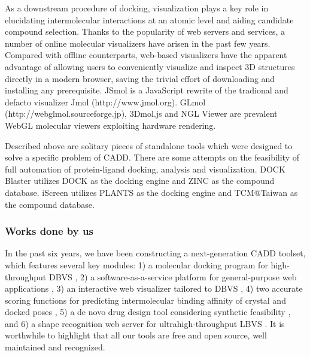 \documentclass[a4paper,12pt]{article}
\begin{document}
As a downstream procedure of docking, visualization plays a key role in elucidating intermolecular interactions at an atomic level and aiding candidate compound selection. Thanks to the popularity of web servers and services, a number of online molecular visualizers have arisen in the past few years. Compared with offline counterparts, web-based visualizers have the apparent advantage of allowing users to conveniently visualize and inspect 3D structures directly in a modern browser, saving the trivial effort of downloading and installing any prerequisite. JSmol \citep{1314} is a JavaScript rewrite of the tradional and defacto visualizer Jmol (http://www.jmol.org). GLmol (http://webglmol.sourceforge.jp), 3Dmol.js \citep{1652} and NGL Viewer \citep{1666} are prevalent WebGL molecular viewers exploiting hardware rendering.

Described above are solitary pieces of standalone tools which were designed to solve a specific problem of CADD. There are some attempts on the feasibility of full automation of protein-ligand docking, analysis and visualization. DOCK Blaster \citep{557} utilizes DOCK \citep{1222} as the docking engine and ZINC \citep{1178} as the compound database. iScreen \citep{899} utilizes PLANTS \citep{607,779} as the docking engine and TCM@Taiwan \citep{528} as the compound database.

\subsubsection*{Works done by us}

In the past six years, we have been constructing a next-generation CADD toolset, which features several key modules: 1) a molecular docking program for high-throughput DBVS \citep{1153}, 2) a software-as-a-service platform for general-purpose web applications \citep{1362}, 3) an interactive web visualizer tailored to DBVS \citep{1366,1265}, 4) two accurate scoring functions for predicting intermolecular binding affinity of crystal and docked poses \citep{1647,1796,1433,1795,1797,1434}, 5) a de novo drug design tool considering synthetic feasibility \citep{1409,1387}, and 6) a shape recognition web server for ultrahigh-throughput LBVS \citep{1749}. It is worthwhile to highlight that all our tools are free and open source, well maintained and recognized.
\end{document}
